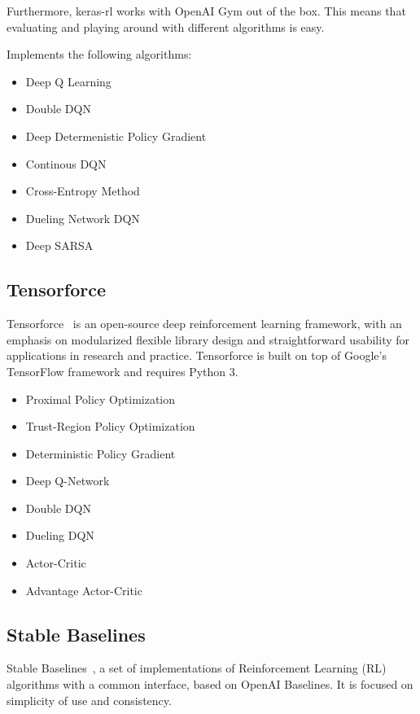 \documentclass[letterpaper, 10 pt]{IEEEconf}
\begin{document}
Furthermore, keras-rl works with OpenAI Gym out of the box. This means
that evaluating and playing around with different algorithms is easy.

Implements the following algorithms:

\begin{itemize}
\item Deep Q Learning
\item Double DQN
\item Deep Determenistic Policy Gradient
\item Continous DQN
\item Cross-Entropy Method
\item Dueling Network DQN
  \item Deep SARSA
\end{itemize}

\subsection{Tensorforce}

Tensorforce~\cite{tensorforce} is an open-source deep reinforcement
learning framework, with an emphasis on modularized flexible library
design and straightforward usability for applications in research and
practice. Tensorforce is built on top of Google's TensorFlow framework
and requires Python 3.


\begin{itemize}
\item Proximal Policy Optimization
\item Trust-Region Policy Optimization
\item Deterministic Policy Gradient
\item Deep Q-Network
\item Double DQN
\item Dueling DQN
\item Actor-Critic
\item Advantage Actor-Critic
\end{itemize}

\subsection{Stable Baselines}

Stable Baselines~\cite{stable-baselines}, a set of implementations of
Reinforcement Learning (RL) algorithms with a common interface, based
on OpenAI Baselines. It is focused on simplicity of use and
consistency.
\end{document}
